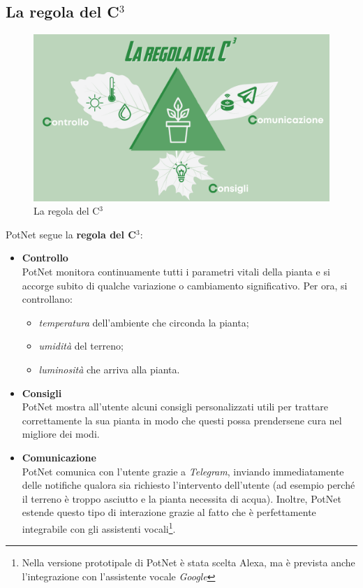 \subsection{La regola del C$^3$}

\begin{figure}[h]
	\centering
	\includegraphics[width=.5\textwidth]{images/c3_rule.png}
	\caption{La regola del C$^3$}
	\label{fig:c3rule}
\end{figure}

PotNet segue la \textbf{regola del C$^3$}:
\begin{itemize}
	\item \textbf{Controllo}\\
	PotNet monitora continuamente tutti i parametri vitali della pianta e si accorge subito di qualche variazione o cambiamento significativo. Per ora, si controllano:
	\begin{itemize}
		\item \textit{temperatura} dell'ambiente che circonda la pianta;
		\item \textit{umidità} del terreno;
		\item \textit{luminosità} che arriva alla pianta.
	\end{itemize}
	
	\item \textbf{Consigli}\\
	PotNet mostra all'utente alcuni consigli personalizzati utili per trattare correttamente la sua pianta in modo che questi possa prendersene cura nel migliore dei modi.
	
	\item \textbf{Comunicazione}\\
	PotNet comunica con l'utente grazie a \textit{Telegram}, inviando immediatamente delle notifiche qualora sia richiesto l'intervento dell'utente (ad esempio perché il terreno è troppo asciutto e la pianta necessita di acqua). Inoltre, PotNet estende questo tipo di interazione grazie al fatto che è perfettamente integrabile con gli assistenti vocali\footnote{Nella versione prototipale di PotNet è stata scelta Alexa, ma è prevista anche l'integrazione con l'assistente vocale \textit{Google}}.
\end{itemize}

